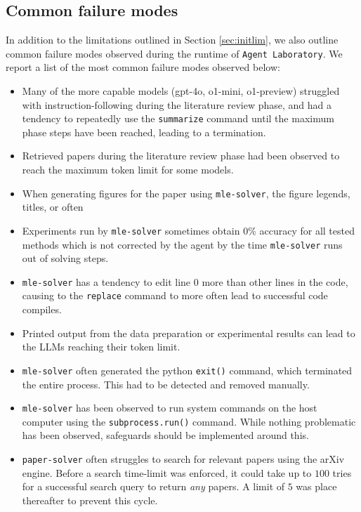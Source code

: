\documentclass[11pt, a4paper]{gdm_format}
\begin{document}
\subsection{Common failure modes}
\label{sec:failuremodes}

In addition to the limitations outlined in Section \ref{sec:initlim}, we also outline common failure modes observed during the runtime of \texttt{Agent Laboratory}. We report a list of the most common failure modes observed below:

\begin{itemize}
    \item Many of the more capable models (gpt-4o, o1-mini, o1-preview) struggled with instruction-following during the literature review phase, and had a tendency to repeatedly use the \texttt{summarize} command until the maximum phase steps have been reached, leading to a termination.
    \item Retrieved papers during the literature review phase had been observed to reach the maximum token limit for some models.
    \item When generating figures for the paper using \texttt{mle-solver}, the figure legends, titles, or  often 
    \item Experiments run by \texttt{mle-solver} sometimes obtain $0\%$ accuracy for all tested methods which is not corrected by the agent by the time \texttt{mle-solver} runs out of solving steps.
    \item \texttt{mle-solver} has a tendency to edit line $0$ more than other lines in the code, causing to the \texttt{replace} command to more often lead to successful code compiles.
    \item Printed output from the data preparation or experimental results can lead to the LLMs reaching their token limit.
    \item \texttt{mle-solver} often generated the python \lstinline{exit()} command, which terminated the entire process. This had to be detected and removed manually.
    \item \texttt{mle-solver} has been observed to run system commands on the host computer using the \lstinline{subprocess.run()} command. While nothing problematic has been observed, safeguards should be implemented around this.
    \item \texttt{paper-solver} often struggles to search for relevant papers using the arXiv engine. Before a search time-limit was enforced, it could take up to $100$ tries for a successful search query to return \textit{any} papers. A limit of $5$ was place thereafter to prevent this cycle.
\end{itemize}
\end{document}
